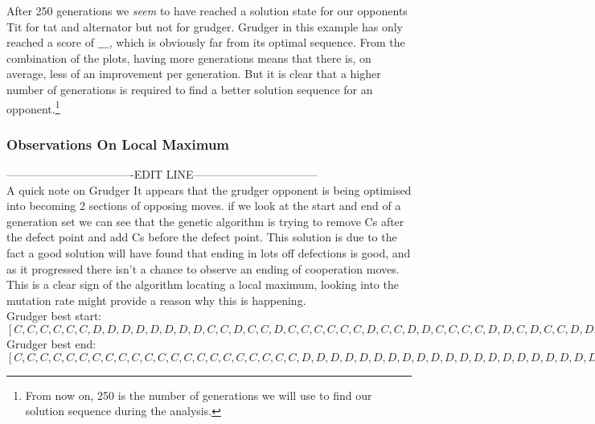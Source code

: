 After 250 generations we \textit{seem} to have reached a solution state for our opponents Tit for tat and alternator but not for grudger. 
Grudger in this example has only reached a score of $\_\_\_$, which is obviously far from its optimal sequence.
From the combination of the plots, having more generations means that there is, on average, less of an improvement per generation.
But it is clear that a higher number of generations is required to find a better solution sequence for an opponent.\footnote{From now on, 250 is the number of generations we will use to find our solution sequence during the analysis.}\\ 

\subsubsection{Observations On Local Maximum}
----------------------------------EDIT LINE---------------------------------\\
A quick note on Grudger It appears that the grudger opponent is being optimised into becoming 2 sections of opposing moves. if we look at the start and end of a generation set we can see that the genetic algorithm is trying to remove Cs after the defect point and add Cs before the defect point. This solution is due to the fact a good solution will have found that ending in lots off defections is good, and as it progressed there isn't a chance to observe an ending of cooperation moves. This is a clear sign of the algorithm locating a local maximum, looking into the mutation rate might provide a reason why this is happening.\\
    
Grudger best start:\([C, C, C, C, C, C, D, D, D, D, D, D, D, D, C, C, D, C, C, D, C, C, C, C, C, C, D, C, C, D, D, C, C, C, C, D, D, C, D, C, C, D, D, D, D, D, D, D, D, D, D, C, D, C, D, D, D, C, D, D, D, C, D, C, D, C, C, D, D, C, D, C, D, D, C, C, C, D, D, D, D, D, C, C, D, D, C, C, D, C, D, D, C, D, C, C, C, C, D, C, C, D, C, D, C, C, D, D, D, C, D, C, C, D, D, C, D, D, D, D, D, D, D, C, C, C, D, D, C, D, D, C, C, C, D, C, D, D, D, D, D, C, D, C, D, C, D, C, D, C, D, C, C, C, C, D, C, D, C, D, D, D, D, C, C, D, C, D, D, D, C, D, C, C, D, D, D, C, C, C, C, D, C, D, D, D, C, C, D, D, D, D, C, C, D, C, C, D, D, D]\)\\ 

Grudger best end:\([C, C, C, C, C, C, C, C, C, C, C, C, C, C, C, C, C, C, C, C, C, C, D, D, D, D, D, D, D, D, D, D, D, D, D, D, D, D, D, D, D, D, D, D, D, D, D, D, D, D, D, D, D, D, D, D, D, D, D, D, D, D, D, D, D, D, D, D, D, D, D, D, D, D, D, D, D, D, D, D, D, D, D, D, D, D, D, D, D, D, D, D, D, D, D, D, D, D, D, D, D, D, D, D, D, D, D, D, D, D, D, D, D, D, D, D, D, D, D, D, D, D, D, D, D, D, D, D, D, D, D, D, D, D, D, D, D, D, D, D, D, D, D, D, D, D, D, D, D, D, D, D, D, D, D, D, D, D, D, D, D, D, D, D, D, D, D, D, D, D, D, D, D, D, D, D, D, D, D, D, D, D, D, D, D, D, D, D, D, D, D, D, D, D, D, D, D, D, D, D]\)\\
    

